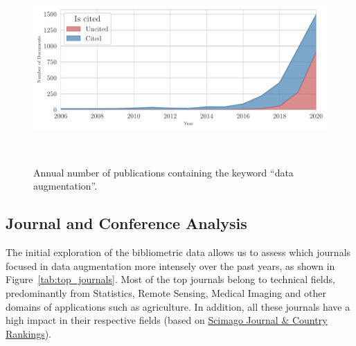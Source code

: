 \documentclass[parskip=full]{scrartcl}
\begin{document}
\begin{figure}[H]
	\centering
    \includegraphics[width=\linewidth]{../analysis/area_chart_cited_documents}
    \caption{Annual number of publications containing the keyword ``data
        augmentation''.
    }~\label{fig:area_chart_cited_documents}
\end{figure}


\subsection{Journal and Conference Analysis}

The initial exploration of the bibliometric data allows us to assess which
journals focused in data augmentation more intensely over the past years, as
shown in Figure~\ref{tab:top_journals}. Most of the top journals belong to
technical fields, predominantly from Statistics, Remote Sensing, Medical
Imaging and other domains of applications such as agriculture. In addition,
all these journals have a high impact in their respective fields (based on 
\href{https://www.scimagojr.com/}{Scimago Journal \& Country Rankings}).   

\begin{table}[H]
    \centering
    \vspace{.2cm}
    \caption{\label{tab:top_journals}
        Top journals focusing on data augmentation techniques, sorted by
        citations per document.
    }
\end{table}
\end{document}
